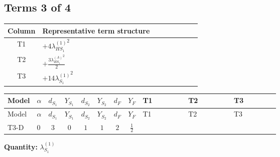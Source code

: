 \documentclass[8pt]{article}
\begin{document}
\begin{landscape}
\subsection*{Terms 3 of 4}
\begin{center}
\begin{tabular}{@{}c >{\raggedright\arraybackslash}p{0.82\linewidth}@{}}
\toprule
Column & Representative term structure \\
\midrule
T1 & \(\displaystyle +4 {\lambda_{HS_1}^{(1)}}^2\) \\
\midrule
T2 & \(\displaystyle +\frac{3 {\lambda_{HS_1}^{(A)}}^2}{2}\) \\
\midrule
T3 & \(\displaystyle +14 {\lambda_{S_1}^{(1)}}^2\) \\
\midrule
\bottomrule
\end{tabular}
\end{center}
\smallskip
\tiny
\begin{longtable}{@{}llcccccc >{\raggedright\arraybackslash}p{0.21\linewidth} >{\raggedright\arraybackslash}p{0.21\linewidth} >{\raggedright\arraybackslash}p{0.21\linewidth}@{}}
\toprule
Model & $\alpha$ & $d_{S_1}$ & $Y_{S_1}$ & $d_{S_2}$ & $Y_{S_2}$ & $d_F$ & $Y_F$ & T1 & T2 & T3 \\
\midrule
\endfirsthead
\toprule
Model & $\alpha$ & $d_{S_1}$ & $Y_{S_1}$ & $d_{S_2}$ & $Y_{S_2}$ & $d_F$ & $Y_F$ & T1 & T2 & T3 \\
\midrule
\endhead
T3-D & $0$ & $3$ & $0$ & $1$ & $1$ & $2$ & $\frac{1}{2}$ & \scriptsize\adjustbox{max width=\linewidth}{$\begin{gathered} +4 {\lambda_{HS_1}^{(1)}}^2\end{gathered}$} & \scriptsize\adjustbox{max width=\linewidth}{$\begin{gathered} +\frac{3 {\lambda_{HS_1}^{(A)}}^2}{2}\end{gathered}$} & \scriptsize\adjustbox{max width=\linewidth}{$\begin{gathered} +14 {\lambda_{S_1}^{(1)}}^2\end{gathered}$} \\
\midrule
\bottomrule
\end{longtable}
\clearpage
\noindent\textbf{Quantity: }$\lambda_{S_1}^{(1)}$\par\smallskip

\end{landscape}
\end{document}
